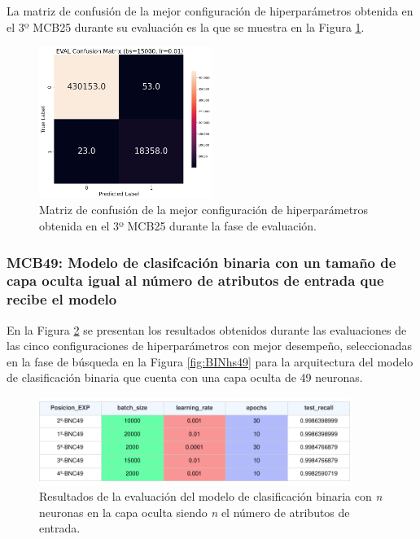 La matriz de confusión de la mejor configuración de hiperparámetros obtenida en el 3º MCB25 durante su evaluación es la que se muestra en la Figura \ref{fig:MC_EVAL_MCB25}.

\begin{figure}[H]
    \centering
    \includegraphics[width=0.5\textwidth]{./img/evaluacion/matrices_confusion/MC_EVAL_MCB25.png}
    \caption{Matriz de confusión de la mejor configuración de hiperparámetros obtenida en el 3º MCB25 durante la fase de evaluación.}
    \label{fig:MC_EVAL_MCB25}
\end{figure}


\subsubsection{MCB49: Modelo de clasifcación binaria con un tamaño de capa oculta igual al número de atributos de entrada que recibe el modelo}
En la Figura \ref{fig:EVALMCB49} se presentan los resultados obtenidos durante las evaluaciones de las cinco configuraciones de hiperparámetros con mejor desempeño, seleccionadas en la fase de búsqueda en la Figura \ref{fig:BINhs49} para la arquitectura del modelo de clasificación binaria que cuenta con una capa oculta de 49 neuronas.

\begin{figure}[H]
    \centering
    \includegraphics[width=0.9\textwidth]{./img/evaluacion/resultados/EVALMCB49.pdf}
    \caption{Resultados de la evaluación del modelo de clasificación binaria con \textit{n} neuronas en la capa oculta siendo \textit{n} el número de atributos de entrada.}
    \label{fig:EVALMCB49}
\end{figure}

